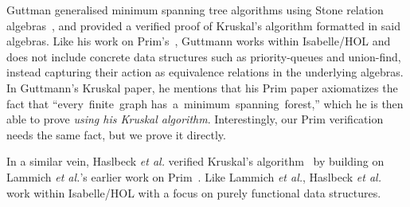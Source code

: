 Guttman generalised minimum spanning tree algorithms using Stone relation algebras~\cite{DBLP:journals/jlp/Guttmann18}, and provided a verified proof of Kruskal's algorithm formatted in said algebras.  Like his work on Prim's~\cite{DBLP:conf/ictac/Guttmann16}, Guttmann works within Isabelle/HOL and does not include concrete data structures such as priority-queues and union-find, instead capturing their action as equivalence relations in the underlying algebras. In Guttmann's Kruskal paper, he mentions that his Prim paper axiomatizes the fact that ``every~finite~graph has~a~minimum~spanning~forest,'' which he is then able to prove \emph{using his Kruskal algorithm}.  Interestingly, our Prim verification needs the same fact, but we prove it directly. %

In a similar vein, Haslbeck \emph{et al.} verified Kruskal's algorithm~\cite{DBLP:journals/afp/HaslbeckLB19} by building on Lammich \emph{et al.}'s earlier work on Prim~\cite{DBLP:journals/afp/LammichN19}.  Like Lammich \emph{et al.}, Haslbeck \emph{et al.} work within Isabelle/HOL with a focus on purely functional data structures.




